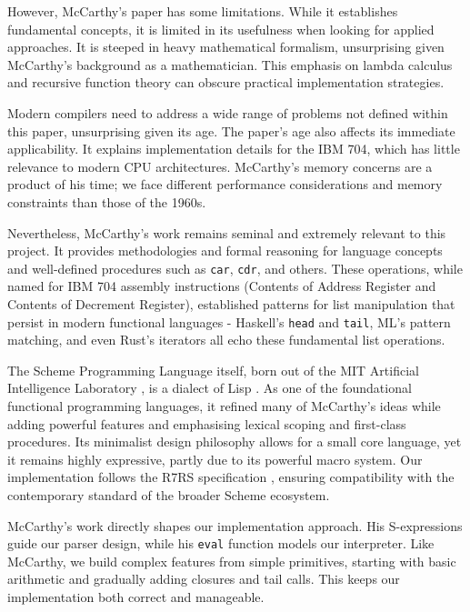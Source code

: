 \documentclass[final]{cmpreport_02}
\begin{document}
However, McCarthy's paper has some limitations. While it establishes fundamental concepts, it is limited in its usefulness when looking for applied approaches. It is steeped in heavy mathematical formalism, unsurprising given McCarthy's background as a mathematician. This emphasis on lambda calculus and recursive function theory can obscure practical implementation strategies.

Modern compilers need to address a wide range of problems not defined within this paper, unsurprising given its age. The paper's age also affects its immediate applicability. It explains implementation details for the IBM 704, which has little relevance to modern CPU architectures. McCarthy's memory concerns are a product of his time; we face different performance considerations and memory constraints than those of the 1960s.

Nevertheless, McCarthy's work remains seminal and extremely relevant to this project. It provides methodologies and formal reasoning for language concepts and well-defined procedures such as \texttt{car}, \texttt{cdr}, and others. These operations, while named for IBM 704 assembly instructions (Contents of Address Register and Contents of Decrement Register), established patterns for list manipulation that persist in modern functional languages - Haskell's \texttt{head} and \texttt{tail}, ML's pattern matching, and even Rust's iterators all echo these fundamental list operations.

The Scheme Programming Language itself, born out of the MIT Artificial Intelligence Laboratory \cite{SchemeInterpMIT}, is a dialect of Lisp \cite{structureandinterp}. As one of the foundational functional programming languages, it refined many of McCarthy's ideas while adding powerful features and emphasising lexical scoping and first-class procedures. Its minimalist design philosophy allows for a small core language, yet it remains highly expressive, partly due to its powerful macro system. Our implementation follows the R7RS specification \cite{r7rs}, ensuring compatibility with the contemporary standard of the broader Scheme ecosystem.

McCarthy's work directly shapes our implementation approach. His S-expressions guide our parser design, while his \texttt{eval} function models our interpreter. Like McCarthy, we build complex features from simple primitives, starting with basic arithmetic and gradually adding closures and tail calls. This keeps our implementation both correct and manageable.
\end{document}
